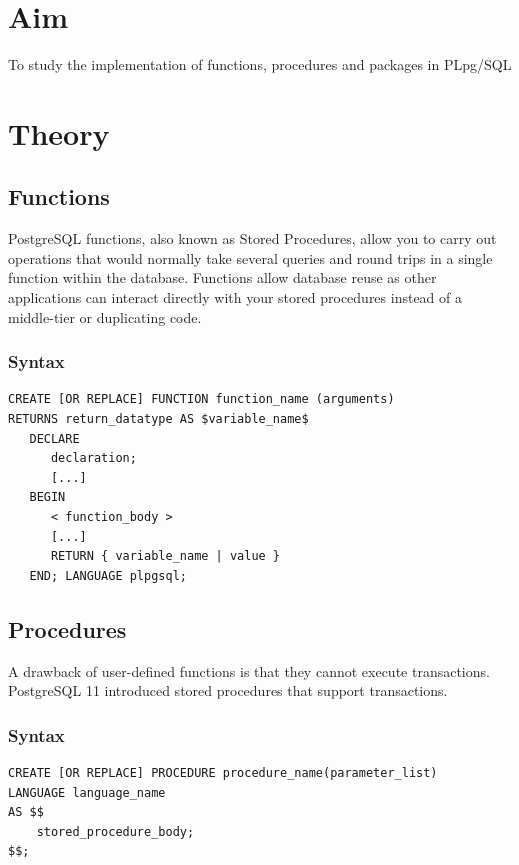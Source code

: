 \section{Aim}
 To study the implementation of functions, procedures and packages in PLpg/SQL

\section{{Theory}}

\subsection{Functions}

PostgreSQL functions, also known as Stored Procedures, allow you to carry out operations that would normally take several queries and round trips in a single function within the database. Functions allow database reuse as other applications can interact directly with your stored procedures instead of a middle-tier or duplicating code.
\newline
\newline

\subsubsection{Syntax}

\begin{verbatim}
CREATE [OR REPLACE] FUNCTION function_name (arguments) 
RETURNS return_datatype AS $variable_name$
   DECLARE
      declaration;
      [...]
   BEGIN
      < function_body >
      [...]
      RETURN { variable_name | value }
   END; LANGUAGE plpgsql;
\end{verbatim}

\subsection{Procedures}

A drawback of user-defined functions is that they cannot execute transactions. PostgreSQL 11 introduced stored procedures that support transactions.

\subsubsection{Syntax}

\begin{verbatim}
CREATE [OR REPLACE] PROCEDURE procedure_name(parameter_list)
LANGUAGE language_name
AS $$
    stored_procedure_body;
$$;
\end{verbatim}

